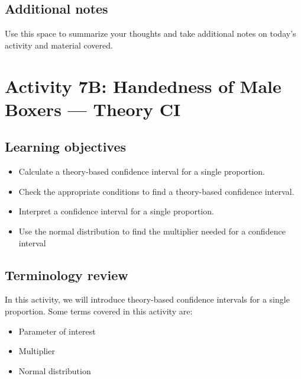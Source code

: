 \documentclass[
]{report}
\begin{document}
\newpage

\hypertarget{additional-notes-10}{%
\subsection{Additional notes}\label{additional-notes-10}}

Use this space to summarize your thoughts and take additional notes on today's activity and material covered.

\newpage

\hypertarget{activity-7b-handedness-of-male-boxers-theory-ci}{%
\section{Activity 7B: Handedness of Male Boxers --- Theory CI}\label{activity-7b-handedness-of-male-boxers-theory-ci}}


\hypertarget{learning-objectives}{%
\subsection{Learning objectives}\label{learning-objectives}}

\begin{itemize}
\item
  Calculate a theory-based confidence interval for a single proportion.
\item
  Check the appropriate conditions to find a theory-based confidence interval.
\item
  Interpret a confidence interval for a single proportion.
\item
  Use the normal distribution to find the multiplier needed for a confidence interval
\end{itemize}

\hypertarget{terminology-review-11}{%
\subsection{Terminology review}\label{terminology-review-11}}

In this activity, we will introduce theory-based confidence intervals for a single proportion. Some terms covered in this activity are:

\begin{itemize}
\item
  Parameter of interest
\item
  Multiplier
\item
  Normal distribution
\end{itemize}
\end{document}

